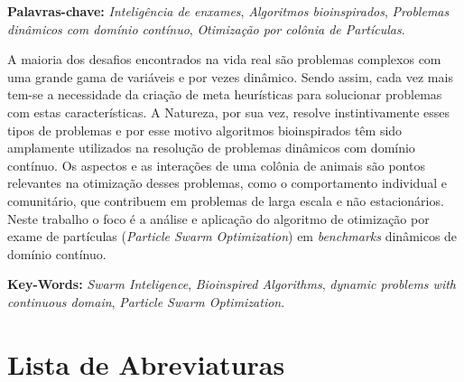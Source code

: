 \noindent \textbf{Palavras-chave:} \textit{Inteligência de enxames}, \textit{Algoritmos bioinspirados}, \textit{Problemas dinâmicos com domínio contínuo}, \textit{Otimização por colônia de Partículas}.


A maioria dos desafios encontrados na vida real são problemas complexos com uma grande gama de variáveis e por vezes dinâmico. Sendo assim, cada vez mais tem-se a necessidade da criação de meta heurísticas para solucionar problemas com estas características. A Natureza, por sua vez, resolve instintivamente esses tipos de problemas e por esse motivo algoritmos bioinspirados têm sido amplamente utilizados na resolução de problemas dinâmicos com domínio contínuo. Os aspectos e as interações de uma colônia de animais são pontos relevantes na otimização desses problemas, como o comportamento individual e comunitário, que contribuem em problemas de larga escala e não estacionários. Neste trabalho o foco é a análise e aplicação do algoritmo de otimização por exame de partículas (\textit{Particle Swarm Optimization}) em \textit{benchmarks} dinâmicos de domínio contínuo.

\noindent \textbf{Key-Words:} \textit{Swarm Inteligence}, \textit{Bioinspired Algorithms}, \textit{dynamic problems with continuous domain}, \textit{Particle Swarm Optimization}.

\tableofcontents
\listoffigures
\listoftables
\newpage
\chapter*{Lista de Abreviaturas\hfill} 
\listofsymbols

\newpage
\pagestyle{myheadings}

